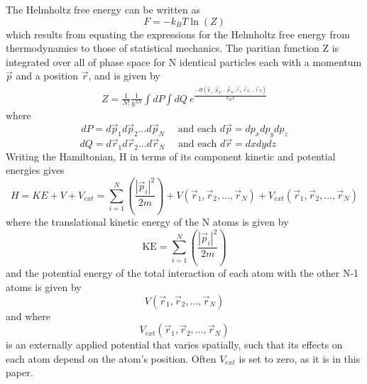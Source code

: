 \documentclass[double,12pt]{beavtex}
\begin{document}
The Helmholtz free energy can be written as
\begin{equation}{F=-k_{B}T\ln(Z)}\end{equation}
which results from equating the expressions for the Helmholtz free energy 
from thermodynamics to those of statistical mechanics. The paritian function 
Z is integrated over all of phase space for N identical particles each with 
a momentum $\vec{p}$ and a position $\vec{r}$, and is given by
\begin{align}  \label{Z_total}
     Z=\frac{1}{N!}\frac{1}{h^{3N}}\int{dP}\int{dQ}~e^\frac{-H(\vec{p}_1,\vec{p}_2,...\vec{p}_N,\vec{r}_1, \vec{r}_2,...\vec{r}_N)}{k_BT}
\end{align}
where
\begin{displaymath}{dP=d\vec{p}_1d\vec{p}_2...d\vec{p}_N \mbox{~~~~and~each~} d\vec{p}=dp_xdp_ydp_z}\end{displaymath}
\begin{displaymath}{dQ=d\vec{r}_1d\vec{r}_2...d\vec{r}_N \mbox{~~~~and~each~} d\vec{r}=dxdydz\mbox{~~~~}}\end{displaymath}
Writing the Hamiltonian, H in terms of its component kinetic and potential energies gives
\begin{equation}{H = KE + V + V_{ext} = \sum_{i=1}^N\left(\frac{|\vec{p}_i|^2}{2m}\right)+V(\vec{r}_1,\vec{r}_2,{...},\vec{r}_N)+V_{ext}(\vec{r}_1,\vec{r}_2,{...},\vec{r}_N)}\end{equation}
where the translational kinetic energy of the N atoms is given by 
\begin{equation}{\text{KE}=\sum_{i=1}^N\left(\frac{|\vec{p}_i|^2}{2m}\right)}\end{equation}
and the potential energy of the total interaction of each atom with the other 
N-1 atoms is given by
\begin{displaymath}{V(\vec{r}_1,\vec{r}_2,{...},\vec{r}_N)}\end{displaymath} 
and where \begin{displaymath}{V_{ext}(\vec{r}_1,\vec{r}_2,{...},\vec{r}_N)}\end{displaymath} 
is an externally applied potential that varies spatially, such that its 
effects on each atom depend on the atom's position. Often $V_{ext}$ is 
set to zero, as it is in this paper. 
\end{document}
